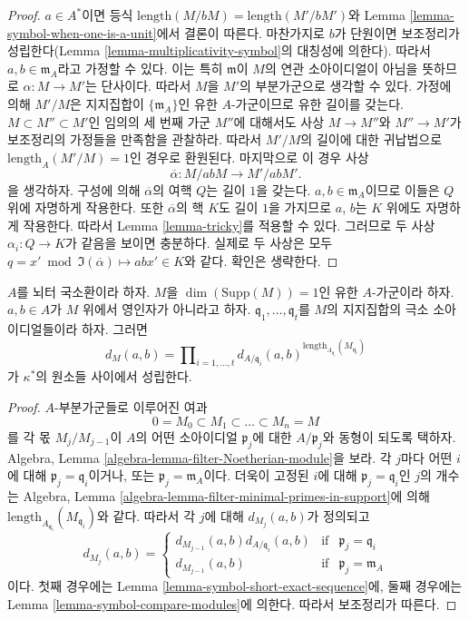 \begin{proof}
$a \in A^*$이면 등식
$\text{length}(M/bM) = \text{length}(M'/bM')$와 Lemma
\ref{lemma-symbol-when-one-is-a-unit}에서 결론이 따른다.
마찬가지로 $b$가 단원이면 보조정리가 성립한다(Lemma
\ref{lemma-multiplicativity-symbol}의 대칭성에 의한다). 따라서
$a, b \in \mathfrak m_A$라고 가정할 수 있다. 이는 특히
$\mathfrak m$이 $M$의 연관 소아이디얼이 아님을 뜻하므로
$\alpha : M \to M'$는 단사이다. 따라서 $M$을 $M'$의 부분가군으로
생각할 수 있다. 가정에 의해 $M'/M$은 지지집합이
$\{\mathfrak m_A\}$인 유한 $A$-가군이므로 유한 길이를 갖는다.
$M \subset M'' \subset M'$인 임의의 세 번째 가군 $M''$에 대해서도
사상 $M \to M''$와 $M'' \to M'$가 보조정리의 가정들을 만족함을
관찰하라. 따라서 $M'/M$의 길이에 대한 귀납법으로
$\text{length}_A(M'/M) = 1$인 경우로 환원된다. 마지막으로 이 경우
사상
$$
\overline{\alpha} : M/abM \longrightarrow M'/abM'.
$$
을 생각하자. 구성에 의해 $\overline{\alpha}$의 여핵 $Q$는 길이
$1$을 갖는다. $a, b \in \mathfrak m_A$이므로 이들은 $Q$ 위에
자명하게 작용한다. 또한 $\overline{\alpha}$의 핵 $K$도 길이 $1$을
가지므로 $a$, $b$는 $K$ 위에도 자명하게 작용한다. 따라서 Lemma
\ref{lemma-tricky}를 적용할 수 있다. 그러므로 두 사상
$\alpha_i : Q \to K$가 같음을 보이면 충분하다. 실제로 두 사상은
모두 $q = x' \bmod \Im(\overline{\alpha}) \mapsto abx' \in K$와
같다. 확인은 생략한다.
\end{proof}

\begin{lemma}
\label{lemma-compute-symbol-M}
$A$를 뇌터 국소환이라 하자. $M$을
$\dim(\text{Supp}(M)) = 1$인 유한 $A$-가군이라 하자.
$a, b \in A$가 $M$ 위에서 영인자가 아니라고 하자.
$\mathfrak q_1, \ldots, \mathfrak q_t$를 $M$의 지지집합의 극소
소아이디얼들이라 하자. 그러면
$$
d_M(a, b)
=
\prod\nolimits_{i = 1, \ldots, t}
d_{A/\mathfrak q_i}(a, b)^{
\text{length}_{A_{\mathfrak q_i}}(M_{\mathfrak q_i})}
$$
가 $\kappa^*$의 원소들 사이에서 성립한다.
\end{lemma}

\begin{proof}
$A$-부분가군들로 이루어진 여과
$$
0 = M_0 \subset M_1 \subset \ldots \subset M_n = M
$$
를 각 몫 $M_j/M_{j - 1}$이 $A$의 어떤 소아이디얼
$\mathfrak p_j$에 대한 $A/\mathfrak p_j$와 동형이 되도록 택하자.
Algebra, Lemma \ref{algebra-lemma-filter-Noetherian-module}을 보라.
각 $j$마다 어떤 $i$에 대해 $\mathfrak p_j = \mathfrak q_i$이거나,
또는 $\mathfrak p_j = \mathfrak m_A$이다. 더욱이 고정된 $i$에 대해
$\mathfrak p_j = \mathfrak q_i$인 $j$의 개수는 Algebra, Lemma
\ref{algebra-lemma-filter-minimal-primes-in-support}에 의해
$\text{length}_{A_{\mathfrak q_i}}(M_{\mathfrak q_i})$와 같다.
따라서 각 $j$에 대해 $d_{M_j}(a, b)$가 정의되고
$$
d_{M_j}(a, b)
=
\left\{
\begin{matrix}
d_{M_{j - 1}}(a, b) d_{A/\mathfrak q_i}(a, b) &
\text{if} & \mathfrak p_j = \mathfrak q_i \\
d_{M_{j - 1}}(a, b) & \text{if} & \mathfrak p_j = \mathfrak m_A
\end{matrix}
\right.
$$
이다. 첫째 경우에는 Lemma \ref{lemma-symbol-short-exact-sequence}에,
둘째 경우에는 Lemma \ref{lemma-symbol-compare-modules}에 의한다.
따라서 보조정리가 따른다.
\end{proof}

